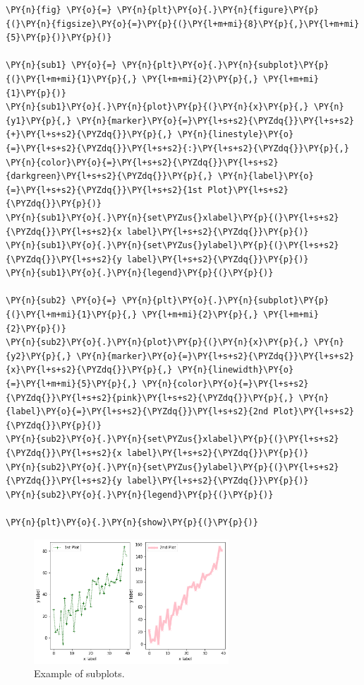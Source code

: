 \begin{tcolorbox}[breakable, size=fbox, boxrule=1pt, pad at break*=1mm,colback=cellbackground, colframe=cellborder]
\begin{Verbatim}[commandchars=\\\{\}]
\PY{n}{fig} \PY{o}{=} \PY{n}{plt}\PY{o}{.}\PY{n}{figure}\PY{p}{(}\PY{n}{figsize}\PY{o}{=}\PY{p}{(}\PY{l+m+mi}{8}\PY{p}{,}\PY{l+m+mi}{5}\PY{p}{)}\PY{p}{)}
	
\PY{n}{sub1} \PY{o}{=} \PY{n}{plt}\PY{o}{.}\PY{n}{subplot}\PY{p}{(}\PY{l+m+mi}{1}\PY{p}{,} \PY{l+m+mi}{2}\PY{p}{,} \PY{l+m+mi}{1}\PY{p}{)}
\PY{n}{sub1}\PY{o}{.}\PY{n}{plot}\PY{p}{(}\PY{n}{x}\PY{p}{,} \PY{n}{y1}\PY{p}{,} \PY{n}{marker}\PY{o}{=}\PY{l+s+s2}{\PYZdq{}}\PY{l+s+s2}{+}\PY{l+s+s2}{\PYZdq{}}\PY{p}{,} \PY{n}{linestyle}\PY{o}{=}\PY{l+s+s2}{\PYZdq{}}\PY{l+s+s2}{:}\PY{l+s+s2}{\PYZdq{}}\PY{p}{,} \PY{n}{color}\PY{o}{=}\PY{l+s+s2}{\PYZdq{}}\PY{l+s+s2}{darkgreen}\PY{l+s+s2}{\PYZdq{}}\PY{p}{,} \PY{n}{label}\PY{o}{=}\PY{l+s+s2}{\PYZdq{}}\PY{l+s+s2}{1st Plot}\PY{l+s+s2}{\PYZdq{}}\PY{p}{)}
\PY{n}{sub1}\PY{o}{.}\PY{n}{set\PYZus{}xlabel}\PY{p}{(}\PY{l+s+s2}{\PYZdq{}}\PY{l+s+s2}{x label}\PY{l+s+s2}{\PYZdq{}}\PY{p}{)}
\PY{n}{sub1}\PY{o}{.}\PY{n}{set\PYZus{}ylabel}\PY{p}{(}\PY{l+s+s2}{\PYZdq{}}\PY{l+s+s2}{y label}\PY{l+s+s2}{\PYZdq{}}\PY{p}{)}
\PY{n}{sub1}\PY{o}{.}\PY{n}{legend}\PY{p}{(}\PY{p}{)}
	
\PY{n}{sub2} \PY{o}{=} \PY{n}{plt}\PY{o}{.}\PY{n}{subplot}\PY{p}{(}\PY{l+m+mi}{1}\PY{p}{,} \PY{l+m+mi}{2}\PY{p}{,} \PY{l+m+mi}{2}\PY{p}{)}
\PY{n}{sub2}\PY{o}{.}\PY{n}{plot}\PY{p}{(}\PY{n}{x}\PY{p}{,} \PY{n}{y2}\PY{p}{,} \PY{n}{marker}\PY{o}{=}\PY{l+s+s2}{\PYZdq{}}\PY{l+s+s2}{x}\PY{l+s+s2}{\PYZdq{}}\PY{p}{,} \PY{n}{linewidth}\PY{o}{=}\PY{l+m+mi}{5}\PY{p}{,} \PY{n}{color}\PY{o}{=}\PY{l+s+s2}{\PYZdq{}}\PY{l+s+s2}{pink}\PY{l+s+s2}{\PYZdq{}}\PY{p}{,} \PY{n}{label}\PY{o}{=}\PY{l+s+s2}{\PYZdq{}}\PY{l+s+s2}{2nd Plot}\PY{l+s+s2}{\PYZdq{}}\PY{p}{)}
\PY{n}{sub2}\PY{o}{.}\PY{n}{set\PYZus{}xlabel}\PY{p}{(}\PY{l+s+s2}{\PYZdq{}}\PY{l+s+s2}{x label}\PY{l+s+s2}{\PYZdq{}}\PY{p}{)}
\PY{n}{sub2}\PY{o}{.}\PY{n}{set\PYZus{}ylabel}\PY{p}{(}\PY{l+s+s2}{\PYZdq{}}\PY{l+s+s2}{y label}\PY{l+s+s2}{\PYZdq{}}\PY{p}{)}
\PY{n}{sub2}\PY{o}{.}\PY{n}{legend}\PY{p}{(}\PY{p}{)}
	
\PY{n}{plt}\PY{o}{.}\PY{n}{show}\PY{p}{(}\PY{p}{)}
\end{Verbatim}
\end{tcolorbox}

\begin{figure} [htb]
	\centering
	\includegraphics[width=0.65\textwidth]{figures/subplot}
	\caption{Example of subplots.}
	\label{fig:subplot}
\end{figure}

